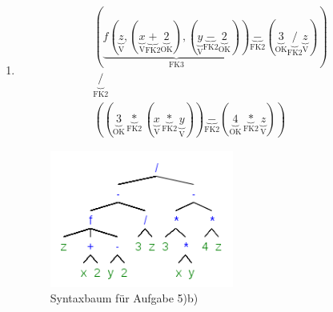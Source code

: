 \documentclass[a4paper]{article}
\begin{document}
\begin{enumerate}
\begin{enumerate}
			\item
			\begin{equation*}
				\begin{aligned}
					(\underbrace{f(\underbrace{z}_{\text{V}}, (\underbrace{x}_{\text{V}} \underbrace{+}_{\text{FK2}} \underbrace{2}_{\text{OK}}), (\underbrace{y}_{\text{V}} \underbrace{-}_{\text{FK2}} \underbrace{2}_{\text{OK}}))}_{\text{FK3}} \underbrace{-}_{\text{FK2}} (\underbrace{3}_{\text{OK}} \underbrace{/}_{\text{FK2}} \underbrace{z}_{\text{V}})) \\ \underbrace{/}_{\text{FK2}} \\ ((\underbrace{3}_{\text{OK}} \underbrace{*}_{\text{FK2}} (\underbrace{x}_{\text{V}} \underbrace{*}_{\text{FK2}} \underbrace{y}_{\text{V}})) \underbrace{-}_{\text{FK2}} (\underbrace{4}_{\text{OK}} \underbrace{*}_{\text{FK2}} \underbrace{z}_{\text{V}}))
				\end{aligned}
			\end{equation*}
			\begin{figure}[ht!]
				\begin{center}
					\includegraphics[height=45mm]{5b.png}
					\caption{Syntaxbaum für Aufgabe 5)b)}
				\end{center}
			\end{figure}
		\end{enumerate}
		
	\end{enumerate}
\end{document}
